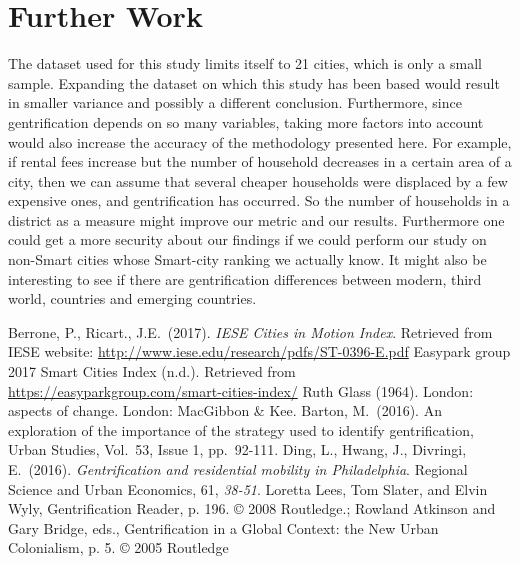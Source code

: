 \documentclass[a4paper, 10pt]{IEEEconf}      %
\begin{document}
\section{Further Work}
The dataset used for this study limits itself to 21 cities, which is only a small sample. Expanding the dataset on which this study has been based would result in smaller variance and possibly a different conclusion. Furthermore, since gentrification depends on so many variables, taking more factors into account would also increase the accuracy of the methodology presented here. For example, if rental fees increase but the number of household decreases in a certain area of a city, then we can assume that several cheaper households were displaced by a few expensive ones, and gentrification has occurred. So the number of households in a district as a measure might improve our metric and our results. Furthermore one could get a more security about our findings if we could perform our study on non-Smart cities whose Smart-city ranking we actually know. 
It might also be interesting to see if there are gentrification differences between modern, third world, countries and emerging countries. 



\addtolength{\textheight}{-12cm}  
\begin{thebibliography}{99}

 Berrone, P., Ricart., J.E.\ (2017). \emph{IESE Cities in Motion Index}. Retrieved from IESE website: \url{http://www.iese.edu/research/pdfs/ST-0396-E.pdf}
 Easypark group 2017 Smart Cities Index (n.d.). Retrieved from \url{https://easyparkgroup.com/smart-cities-index/}
 Ruth Glass (1964). London: aspects of change. London: MacGibbon \& Kee.
 Barton, M.\ (2016). An exploration of the importance of the strategy used to identify gentrification, Urban Studies, Vol.\ 53, Issue 1, pp.\ 92-111.
 Ding, L., Hwang, J., Divringi, E.\ (2016). \emph{Gentrification and residential mobility in Philadelphia}. Regional Science and Urban Economics, 61, \emph{38-51}.
 Loretta Lees, Tom Slater, and Elvin Wyly, Gentrification Reader, p. 196. © 2008 Routledge.; Rowland Atkinson and Gary Bridge, eds., Gentrification in a Global Context: the New Urban Colonialism, p. 5. © 2005 Routledge

\end{thebibliography}
\end{document}
